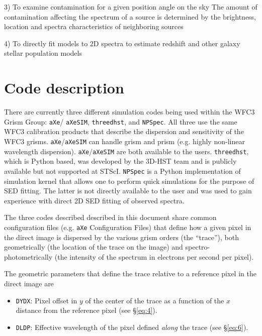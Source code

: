 \documentclass[preprint]{aastex}
\begin{document}
3) To examine contamination for a given position angle on the sky 
The amount of contamination affecting  the spectrum of a source is determined by the brightness, location and spectra characteristics of neighboring sources

4) To directly fit models to 2D spectra to estimate redshift and other galaxy stellar population models





\section{Code description}

There are currently three different simulation codes being used within the WFC3 Grism Group:  \texttt{aXe}/ \texttt{aXeSIM}, \texttt{threedhst}, and \texttt{NPSpec}. All three use the same WFC3 calibration products that describe the dispersion and sensitivity of the WFC3 grisms. \texttt{aXe}/\texttt{aXeSIM} can handle grism and prism (e.g. highly non-linear wavelength dispersion). \texttt{aXe}/\texttt{aXeSIM} are both available to the users. \texttt{threedhst}, which is Python based, was developed by the 3D-HST team and is publicly available but not supported at STScI. \texttt{NPSpec} is a Python implementation of simulation kernel that allows one to perform quick simulations for the purpose of SED fitting. The latter is not directly available to the user and was used to gain experience with direct 2D SED fitting of observed spectra.

The three codes described described in this document share common configuration files (e.g. \texttt{aXe} Configuration Files) that define how a given pixel in the direct image is dispersed by the various grism orders (the ``trace''), both geometrically (the location of the trace on the image) and spectro-photometrically (the intensity of the spectrum in electrons per second per pixel). 

The geometric parameters that define the trace relative to a reference pixel in the direct image are 
\begin{itemize}
    \item \texttt{DYDX}: Pixel offset in $y$ of the center of the trace as a function of the $x$ distance from the reference pixel (see \S\ref{eq:4}).
    
    \item \texttt{DLDP}: Effective wavelength of the pixel defined \textit{along} the trace (see \S\ref{eq:6}). 
\end{itemize}
\end{document}
